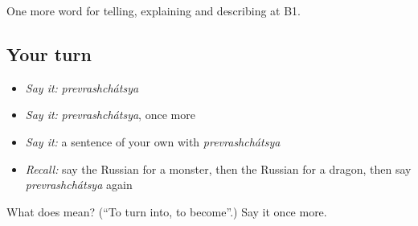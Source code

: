 \begin{grammarlens}[title={What you've built}]
One more word for telling, explaining and describing at B1.
\end{grammarlens}

\subsection*{Your turn}
\begin{itemize}
\raggedright
  \item \emph{Say it:} \emph{prevrashchátsya}
  \item \emph{Say it:} \emph{prevrashchátsya}, once more
  \item \emph{Say it:} a sentence of your own with \emph{prevrashchátsya}
  \item \emph{Recall:} say the Russian for a monster, then the Russian for a dragon, then say \emph{prevrashchátsya} again
\end{itemize}

\begin{tcolorbox}[breakable,colback=teal!4,colframe=teal!35!black,title={Before you move on}]
What does  mean? (\textquotedblleft{}To turn into, to become\textquotedblright{}.) Say it once more.
\end{tcolorbox}
